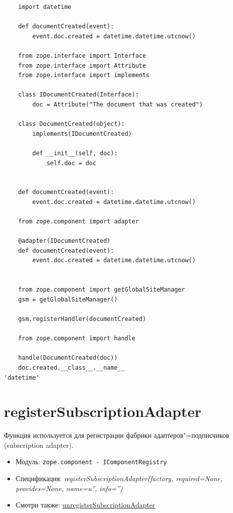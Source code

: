 \documentclass[a4paper,openany,twoside,final]{book}
\providecommand*{\DUroletitlereference}[1]{\textsl{#1}}
\begin{document}
\begin{verbatim}
    import datetime

    def documentCreated(event):
        event.doc.created = datetime.datetime.utcnow()

    from zope.interface import Interface
    from zope.interface import Attribute
    from zope.interface import implements

    class IDocumentCreated(Interface):
        doc = Attribute("The document that was created")

    class DocumentCreated(object):
        implements(IDocumentCreated)

        def __init__(self, doc):
            self.doc = doc


    def documentCreated(event):
        event.doc.created = datetime.datetime.utcnow()

    from zope.component import adapter

    @adapter(IDocumentCreated)
    def documentCreated(event):
        event.doc.created = datetime.datetime.utcnow()


    from zope.component import getGlobalSiteManager
    gsm = getGlobalSiteManager()

    gsm.registerHandler(documentCreated)

    from zope.component import handle

    handle(DocumentCreated(doc))
    doc.created.__class__.__name__
'datetime'
\end{verbatim}


\section*{registerSubscriptionAdapter%
  \label{registersubscriptionadapter}%
}

Функция используется для регистрации фабрики адаптеров"=подписчиков (subscription adapter).

\begin{itemize}

\item Модуль: \texttt{zope.component - IComponentRegistry}

\item Спецификация: \DUroletitlereference{registerSubscriptionAdapter(factory, required=None, provides=None, name=u'', info='')}

\item Смотри также: \hyperref[unregistersubscriptionadapter]{unregisterSubscriptionAdapter}

\end{itemize}
\end{document}

